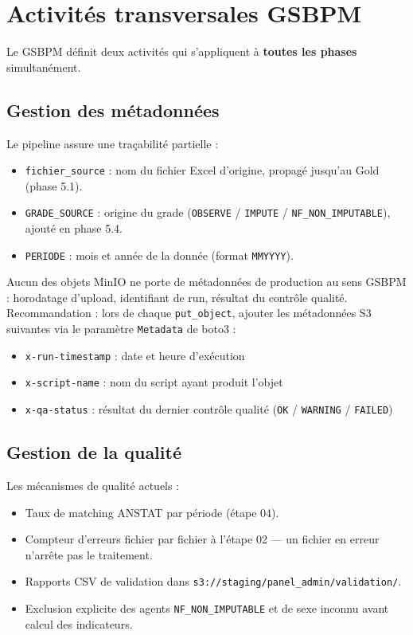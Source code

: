 \documentclass[12pt,a4paper,french]{report}
\newcommand{\bucket}[1]{\texttt{s3://#1}}
\newcommand{\colname}[1]{\texttt{#1}}
\begin{document}
\section{Activités transversales GSBPM}

Le GSBPM définit deux activités qui s'appliquent à \textbf{toutes les phases}
simultanément.

\subsection{Gestion des métadonnées}

Le pipeline assure une traçabilité partielle :
\begin{itemize}
  \item \colname{fichier\_source} : nom du fichier Excel d'origine, propagé
        jusqu'au Gold (phase 5.1).
  \item \colname{GRADE\_SOURCE} : origine du grade (\texttt{OBSERVE} /
        \texttt{IMPUTE} / \texttt{NF\_NON\_IMPUTABLE}), ajouté en phase 5.4.
  \item \colname{PERIODE} : mois et année de la donnée (format \texttt{MMYYYY}).
\end{itemize}

\begin{warningbox}
  Aucun des objets MinIO ne porte de métadonnées de production au sens GSBPM :
  horodatage d'upload, identifiant de run, résultat du contrôle qualité.
  Recommandation : lors de chaque \texttt{put\_object}, ajouter les métadonnées
  S3 suivantes via le paramètre \texttt{Metadata} de boto3 :
  \begin{itemize}[nosep]
    \item \texttt{x-run-timestamp} : date et heure d'exécution
    \item \texttt{x-script-name} : nom du script ayant produit l'objet
    \item \texttt{x-qa-status} : résultat du dernier contrôle qualité
          (\texttt{OK} / \texttt{WARNING} / \texttt{FAILED})
  \end{itemize}
\end{warningbox}

\subsection{Gestion de la qualité}

Les mécanismes de qualité actuels :
\begin{itemize}
  \item Taux de matching ANSTAT par période (étape 04).
  \item Compteur d'erreurs fichier par fichier à l'étape 02 — un fichier en
        erreur n'arrête pas le traitement.
  \item Rapports CSV de validation dans
        \bucket{staging/panel\_admin/validation/}.
  \item Exclusion explicite des agents \texttt{NF\_NON\_IMPUTABLE} et de
        sexe inconnu avant calcul des indicateurs.
\end{itemize}
\end{document}
